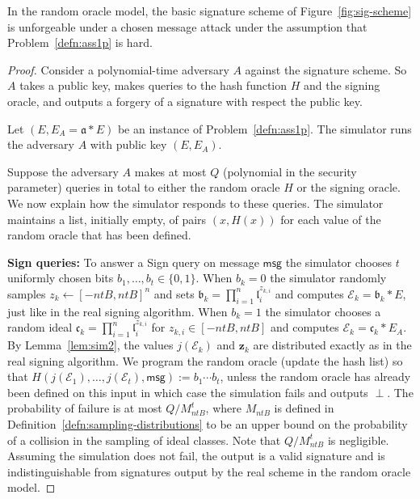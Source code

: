 \documentclass{llncs}
\newcommand{\E}{\mathcal{E}}
\newcommand{\msg}{\mathsf{msg}}
\renewcommand{\a}{\mathfrak{a}}
\renewcommand{\b}{\mathfrak{b}}
\renewcommand{\c}{\mathfrak{c}}
\renewcommand{\l}{\mathfrak{l}}
\newcommand{\z}{\mathbf{z}}
\begin{document}
\begin{theorem}\label{thm:security-basic}
In the random oracle model, the basic signature scheme of Figure~\ref{fig:sig-scheme} is unforgeable under a chosen message attack under the assumption that Problem~\ref{defn:ass1p} is hard.
\end{theorem}

\begin{proof}
Consider a polynomial-time adversary $A$ against the signature scheme. So $A$ takes a public key, makes queries to the hash function $H$ and the signing oracle, and outputs a forgery of a signature with respect the public key.

Let $(E, E_A = \a * E )$ be an instance of Problem~\ref{defn:ass1p}.
The simulator runs the adversary $A$ with public key $(E, E_A)$.

Suppose the adversary $A$ makes at most $Q$ (polynomial in the security parameter) queries in total to either the random oracle $H$ or the signing oracle. We now explain how the simulator responds to these queries. The simulator maintains a list, initially empty, of pairs $(x, H(x))$ for each value of the random oracle that has been defined.

\vskip 0.1cm

\noindent \textbf{Sign queries:}
To answer a Sign query on message $\msg$ the simulator chooses 
$t$ uniformly chosen bits $b_1, \dots, b_t \in \{0,1\}$.
When $b_k = 0$ the simulator randomly samples $z_k \leftarrow [-ntB,ntB]^n$ and sets $\b_k = \prod_{i=1}^n \l_i^{z_{k,i}}$ and computes $\E_k = \b_k * E$, just like in the real signing algorithm.
When $b_k = 1$ the simulator chooses a random ideal $\c_k = \prod_{i=1}^n \l_i^{z_{k,i}}$ for $z_{k,i} \in [-ntB, ntB]$
and computes $\E_k = \c_k * E_A$.
By Lemma~\ref{lem:sim2}, the values $j( \E_k )$ and $\z_k$ are distributed exactly as in the real signing algorithm.
We program the random oracle (update the hash list) so that $H( j( \E_1), \dots, j(\E_t), \msg ) := b_1 \cdots b_t$, unless the random oracle has already been defined on this input in which case the simulation fails and outputs $\perp$.
The probability of failure is at most $Q/M_{ntB}^t$, 
where $M_{ntB}$ is defined in Definition~\ref{defn:sampling-distributions} to be an upper bound on the probability of a collision in the sampling of ideal classes.
Note that $Q/M_{ntB}^t$ is negligible.
Assuming the simulation does not fail, the output is a valid signature and is indistinguishable from signatures output by the real scheme in the random oracle model.


\end{proof}
\end{document}
